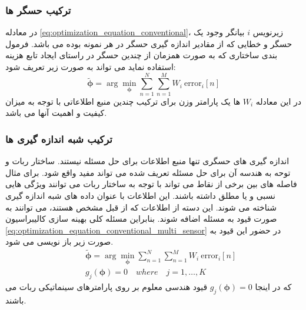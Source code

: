 \subsubsection{ترکیب حسگر ها}
در معادله 
\ref{eq:optimization_equation_conventional}،
زیرنویس 
$i$
بیانگر وجود یک حسگر و خطایی که از مقادیر اندازه گیری حسگر در هر نمونه بوده می باشد. فرمول بندی ساختاری که به صورت همزمان از چندین حسگر در راستای ایجاد تابع هزینه استفاده نماید می تواند به صورت زیر تعریف شود:
\begin{equation}\label{eq:optimization_equation_conventional_multi_sensor}
	\tilde{\boldsymbol{\phi}} =  \arg\min_{\boldsymbol{\phi}} \sum_{n = 1 }^{N} \sum_{n = 1 }^{M} W_i~\text{error}_i[n] 
\end{equation}
در این معادله 
$W_i$
ها یک پارامتر وزن برای ترکیب چندین منبع اطلاعاتی با توجه به میزان کیفیت و اهمیت آنها می باشد.


\subsubsection{ترکیب شبه اندازه گیری ها}
اندازه گیری های حسگری تنها منبع اطلاعات برای حل مسئله نیستند. ساختار ربات و توحه به هندسه آن برای حل مسئله تعریف شده می تواند مفید واقع شود. برای مثال فاصله های بین برخی از نقاط می تواند با توجه به ساختار ربات می توانند ویژگی هایی نسبی و یا مطلق داشته باشند. این اطلاعات با عنوان داده های شبه اندازه گیری شناخته می شوند. این دسته از اطلاعات که از قبل مشخص هستند، می توانند به صورت قیود به مسئله اضافه شوند. بنابراین مسئله کلی بهینه سازی کالیبراسیون
\ref{eq:optimization_equation_conventional_multi_sensor}
در حضور این قیود به صورت زیر باز نویسی می شود. 
\begin{equation}
	\begin{aligned}
		&\tilde{\boldsymbol{\phi}} =  \arg\min_{\boldsymbol{\phi}} \sum_{n = 1 }^{N} \sum_{n = 1 }^{M} W_i~\text{error}_i[n] \\
		\quad &g_j(\boldsymbol{\phi}) = 0 \quad where \quad j = 1, \ldots, K
	\end{aligned}
\end{equation}
که در اینجا
$g_j(\boldsymbol{\phi}) = 0$ 
قیود هندسی معلوم بر روی پارامترهای سینماتیکی ربات می باشند.

